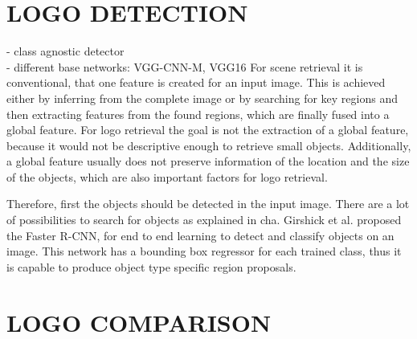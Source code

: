 \documentclass[a4paper,twoside]{article}
\begin{document}
\section{\uppercase{Logo Detection}}
\noindent- class agnostic detector \\
- different base networks: VGG-CNN-M, VGG16
For scene retrieval it is conventional, that one feature is created for an input image. This is achieved either by inferring from the complete image or by searching for key regions and then extracting features from the found regions, which are finally fused into a global feature. For logo retrieval the goal is not the extraction of a global feature, because it would not be descriptive enough to retrieve small objects. Additionally, a global feature usually does not preserve information of the location and the size of the objects, which are also important factors for logo retrieval.

Therefore, first the objects should be detected in the input image. There are a lot of possibilities to search for objects as explained in cha. Girshick et al. \cite{ren2015} proposed the Faster R-CNN, for end to end learning to detect and classify objects on an image. This network has a bounding box regressor for each trained class, thus it is capable to produce object type specific region proposals.

\section{\uppercase{Logo Comparison}}
\end{document}
